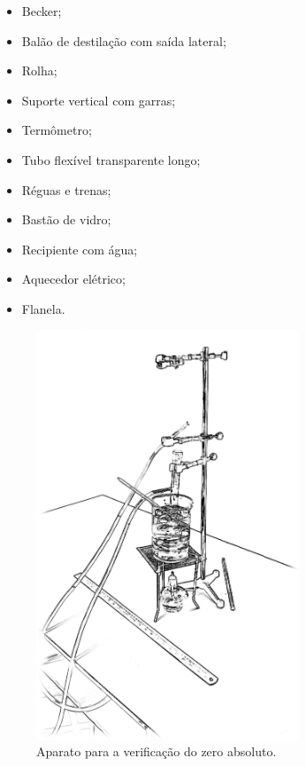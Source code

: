 \begin{multicols}{2}
\begin{itemize}
	\item Becker;
	\item Balão de destilação com saída lateral;
	\item Rolha;
	\item Suporte vertical com garras;
	\item Termômetro;
	\item Tubo flexível transparente longo;
	\item Réguas e trenas;
	\item Bastão de vidro;
	\item Recipiente com água;
    \item Aquecedor elétrico;
	\item Flanela.
\end{itemize}
\end{multicols}

\begin{figure}[!h]
\centering
\forceversofloat
\includegraphics[width=0.7\textwidth]{Ilustrations/AparatoZeroAbs.png}
\caption{Aparato para a verificação do zero absoluto.}
\end{figure}
